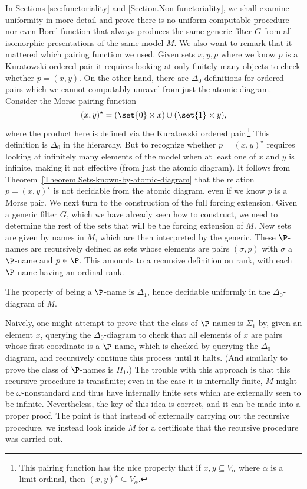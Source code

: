 \documentclass{amsart}
\begin{document}
In Sections \ref{sec:functoriality} and \ref{Section.Non-functoriality}, we shall examine uniformity in more detail and prove there is no uniform computable procedure nor even Borel function that always
produces the same generic filter $G$ from all isomorphic presentations of the same model $M$.
We also want to remark that it mattered which pairing function we used. Given sets $x,y,p$ where we know $p$ is a Kuratowski ordered pair it requires looking at only finitely many objects to check whether $p = (x,y)$. On the other hand, there are $\Delta_0$ definitions for ordered pairs which we cannot computably unravel from just the atomic diagram. Consider the Morse pairing function
$$(x,y)^\star = (\set{0} \times x) \cup (\set{1} \times y),$$
where the product here is defined via the Kuratowski ordered pair.\footnote{This pairing function has the nice property that if $x,y \subseteq V_\alpha$ where $\alpha$ is a limit ordinal, then $(x,y)^\star \subseteq V_\alpha$.}
This definition is $\Delta_0$ in the \Levy{} hierarchy. But to recognize whether $p = (x,y)^\star$ requires looking at infinitely many elements of the model when at least one of $x$ and $y$ is infinite, making it not effective (from just the atomic diagram). It follows from Theorem~\ref{Theorem.Sets-known-by-atomic-diagram} that the relation $p = (x,y)^\star$ is not decidable from the atomic diagram, even if we know $p$ is a Morse pair.
\smallskip
We next turn to the construction of the full forcing extension.
Given a generic filter $G$, which we have already seen how to construct, we need to determine the rest of the sets that will be the forcing extension of $M$. New sets are given by names in $M$, which are then interpreted by the generic.
These $\P$-names are recursively defined as sets whose elements are pairs $(\sigma,p)$ with $\sigma$ a $\P$-name and $p \in \P$. This amounts to a recursive definition on rank, with each $\P$-name having an ordinal rank.
\begin{lemma}
\label{lemma:Pnames}
The property of being a $\P$-name is $\Delta_1$, hence decidable uniformly in the $\Delta_0$-diagram of $M$.
\end{lemma}
Naively, one might attempt to prove that the class of $\P$-names is $\Sigma_1$ by, given an element $x$, querying the $\Delta_0$-diagram to check that all elements of $x$ are pairs whose first coordinate is a $\P$-name, which is checked by querying the $\Delta_0$-diagram, and recursively continue this process until it halts. (And similarly to prove the class of $\P$-names is $\Pi_1$.) The trouble with this approach is that this recursive procedure is transfinite; even in the case it is internally finite, $M$ might be $\omega$-nonstandard and thus have internally finite sets which are externally seen to be infinite. Nevertheless, the key of this idea is correct, and it can be made into a proper proof. The point is that instead of externally carrying out the recursive procedure, we instead look inside $M$ for a certificate that the recursive procedure was carried out.
\end{document}
